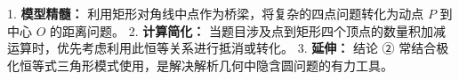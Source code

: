 \begin{summarybox}
1. \textbf{模型精髓：} 利用矩形对角线中点作为桥梁，将复杂的四点问题转化为动点 $P$ 到中心 $O$ 的距离问题。
2. \textbf{计算简化：} 当题目涉及点到矩形四个顶点的数量积加减运算时，优先考虑利用此恒等关系进行抵消或转化。
3. \textbf{延伸：} 结论 ② 常结合极化恒等式三角形模式使用，是解决解析几何中隐含圆问题的有力工具。
\end{summarybox}
